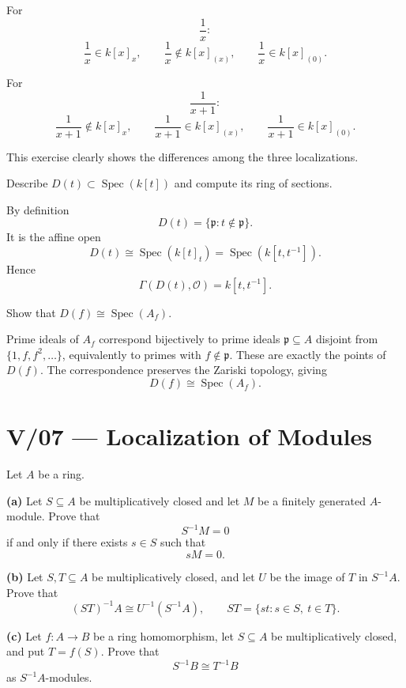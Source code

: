 \begin{solution}
For
\[
\frac{1}{x}:
\]
\[
\frac{1}{x}\in k[x]_x,
\qquad
\frac{1}{x}\notin k[x]_{(x)},
\qquad
\frac{1}{x}\in k[x]_{(0)}.
\]

For
\[
\frac{1}{x+1}:
\]
\[
\frac{1}{x+1}\notin k[x]_x,
\qquad
\frac{1}{x+1}\in k[x]_{(x)},
\qquad
\frac{1}{x+1}\in k[x]_{(0)}.
\]

This exercise clearly shows the differences among the three localizations.
\end{solution}


\begin{problem}[CP-V-0097]
\label{prob:cp-v-0097}
Describe \(D(t)\subset \operatorname{Spec}(k[t])\) and compute its ring of sections.
\end{problem}

\begin{solution}
By definition
\[
D(t)=\{\mathfrak p:t\notin\mathfrak p\}.
\]
It is the affine open
\[
D(t)\cong\operatorname{Spec}(k[t]_t)
=\operatorname{Spec}(k[t,t^{-1}]).
\]
Hence
\[
\Gamma(D(t),\mathcal O)=k[t,t^{-1}].
\]
\end{solution}


\begin{problem}[CP-V-0098]
\label{prob:cp-v-0098}
Show that \(D(f)\cong \operatorname{Spec}(A_f)\).
\end{problem}

\begin{solution}
Prime ideals of \(A_f\) correspond bijectively to prime ideals \(\mathfrak p\subseteq A\) disjoint from \(\{1,f,f^2,\dots\}\), equivalently to primes with \(f\notin\mathfrak p\). These are exactly the points of \(D(f)\). The correspondence preserves the Zariski topology, giving
\[
D(f)\cong\operatorname{Spec}(A_f).
\]
\end{solution}



\section*{V/07 --- Localization of Modules}

\begin{problem}[CP-V-0012]
\label{prob:cp-v-0012}
Let \(A\) be a ring.

\textbf{(a)} Let \(S\subseteq A\) be multiplicatively closed and let \(M\) be a
finitely generated \(A\)-module. Prove that
\[
S^{-1}M=0
\]
if and only if there exists \(s\in S\) such that
\[
sM=0.
\]

\textbf{(b)} Let \(S,T\subseteq A\) be multiplicatively closed, and let \(U\) be
the image of \(T\) in \(S^{-1}A\). Prove that
\[
(ST)^{-1}A\cong U^{-1}(S^{-1}A),
\qquad
ST=\{st:s\in S,\ t\in T\}.
\]

\textbf{(c)} Let \(f:A\to B\) be a ring homomorphism, let \(S\subseteq A\) be
multiplicatively closed, and put \(T=f(S)\). Prove that
\[
S^{-1}B\cong T^{-1}B
\]
as \(S^{-1}A\)-modules.
\end{problem}

